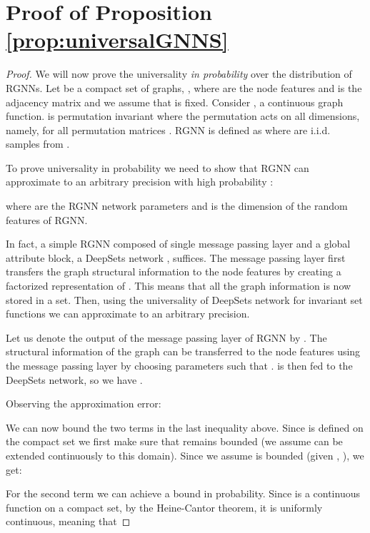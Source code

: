 \documentclass{article} \usepackage{iclr2021_conference,times}
\begin{document}


\appendix

\section{Proof of Proposition \ref{prop:universalGNNS}} \label{app:proof_uni}

\begin{proof}

We will now prove the universality \emph{in probability} over the distribution  of RGNNs.
Let  be a compact set of graphs, , where  are the node features and  is the adjacency matrix and we assume that  is fixed. Consider , a continuous graph function.  is permutation invariant where the permutation acts on all  dimensions, namely,  for all permutation matrices .
RGNN is defined as  where  are i.i.d. samples from .

To prove universality in probability we need to show that RGNN can approximate  to an arbitrary precision  with high probability :

where  are the RGNN network parameters and  is the dimension of the random features of RGNN. 

In fact, a simple RGNN composed of single message passing layer and a global attribute block, a DeepSets network \citep{zaheer2017deep}, suffices. The message passing layer first transfers the graph structural information to the node features by creating a factorized representation of . This means that all the graph information is now stored in a set. Then, using the universality of DeepSets network for invariant set functions we can approximate  to an arbitrary precision. 

 Let us denote the output of the message passing layer of RGNN by . The structural information of the graph can be transferred to the node features using the message passing layer by choosing parameters such that .  is then fed to the DeepSets network, so we have .

Observing the approximation error: 


We can now bound the two terms in the last inequality above. Since  is defined on the compact set  we first make sure that  remains bounded (we assume  can be extended continuously to this domain). Since we assume  is bounded (given , ), we get:




For the second term we can achieve a bound in probability. Since  is a continuous function on a compact set, by the Heine-Cantor theorem, it is uniformly continuous, meaning that 



\end{proof}
\end{document}
